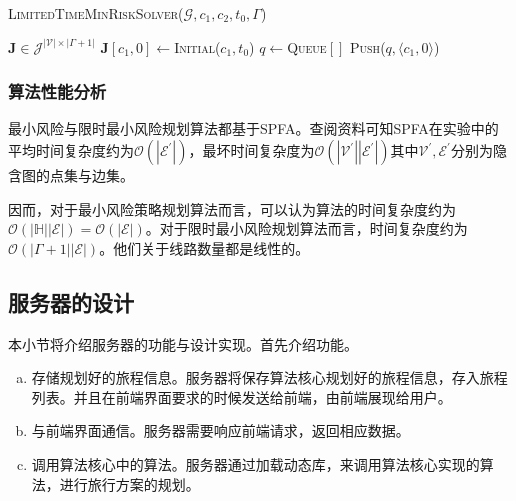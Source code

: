 \begin{algorithm}[t]
\caption{\textsc{LimitedTimeMinRiskSolver}($\mathcal G, c_1, c_2, t_0, \Gamma$)}
\label{algo:limited-time-min-risk-solver}
$\bm J \in \mathcal J^{ |\mathcal V| \times |\Gamma + 1| }$\;
$\bm J[c_1, 0] \gets $\textsc{Initial}($c_1, t_0$)\;
$q \gets $\textsc{Queue}$[ ]$\;
\textsc{Push}($q, \langle c_1, 0 \rangle$)\;
\end{algorithm}

\subsubsection{算法性能分析}

最小风险与限时最小风险规划算法都基于SPFA。查阅资料可知SPFA在实验中的平均时间复杂度约为$\mathcal O(|\mathcal E^\prime|)$，最坏时间复杂度为$\mathcal O(|\mathcal V^\prime| |\mathcal E^\prime|)$其中$\mathcal V^\prime, \mathcal E^\prime$分别为隐含图的点集与边集。

因而，对于最小风险策略规划算法而言，可以认为算法的时间复杂度约为$\mathcal O(|\mathds H| |\mathcal E|) = \mathcal O(|\mathcal E|)$。对于限时最小风险规划算法而言，时间复杂度约为$\mathcal O(| \Gamma + 1 | | \mathcal E |)$。他们关于线路数量都是线性的。

\subsection{服务器的设计}

本小节将介绍服务器的功能与设计实现。首先介绍功能。
\begin{enumerate}[(a)]
  \item 存储规划好的旅程信息。服务器将保存算法核心规划好的旅程信息，存入旅程列表。并且在前端界面要求的时候发送给前端，由前端展现给用户。
  \item 与前端界面通信。服务器需要响应前端请求，返回相应数据。
  \item 调用算法核心中的算法。服务器通过加载动态库，来调用算法核心实现的算法，进行旅行方案的规划。
\end{enumerate}

